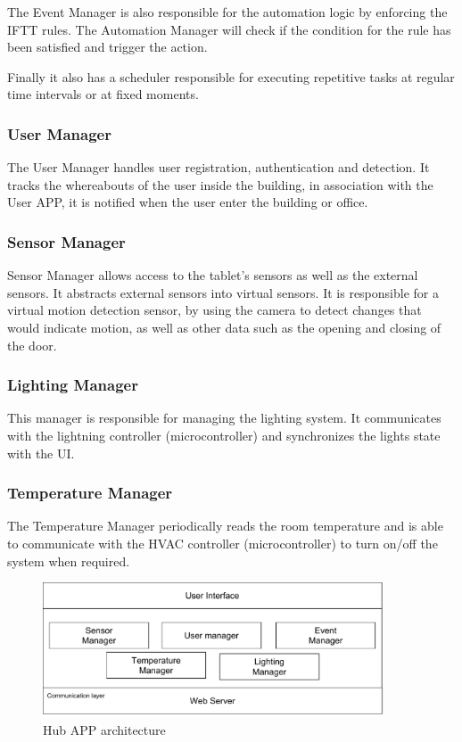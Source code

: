 The Event Manager is also responsible for the automation logic by enforcing the \ac{IFTT} rules. The Automation Manager will check if the condition for the rule has been satisfied and trigger the action. 

Finally it also has a scheduler responsible for executing repetitive tasks at regular time intervals or at fixed moments.


\subsubsection{User Manager}
The User Manager handles user registration, authentication and detection. It tracks the whereabouts of the user inside the building, in association with the User APP, it is notified when the user enter the building or office.


\subsubsection{Sensor Manager}
Sensor Manager allows access to the tablet's sensors as well as the external sensors. It abstracts external sensors into virtual sensors. It is responsible for a virtual motion detection sensor, by using the camera to detect changes that would indicate motion, as well as other data such as the opening and closing of the door.


\subsubsection{Lighting Manager}

This manager is responsible for managing the lighting system. It communicates with the lightning controller (microcontroller) and synchronizes the lights state with the \ac{UI}.

\subsubsection{Temperature Manager}

The Temperature Manager periodically reads the room temperature and is able to communicate with the \ac{HVAC} controller (microcontroller) to turn on/off the system when required.


\begin{figure}[h]
\centering
\includegraphics[width=0.9\textwidth]{Figures/software_Hub}
\caption{Hub APP architecture }
\label{software2}
\end{figure}



